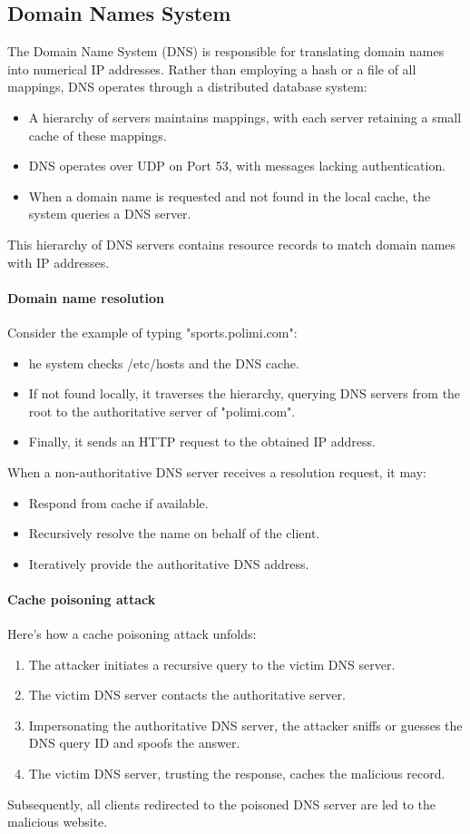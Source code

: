 \subsection{Domain Names System}
The Domain Name System (DNS) is responsible for translating domain names into numerical IP addresses. 
Rather than employing a hash or a file of all mappings, DNS operates through a distributed database system:
\begin{itemize}
    \item A hierarchy of servers maintains mappings, with each server retaining a small cache of these mappings.
    \item DNS operates over UDP on Port 53, with messages lacking authentication.
    \item When a domain name is requested and not found in the local cache, the system queries a DNS server.
\end{itemize}
This hierarchy of DNS servers contains resource records to match domain names with IP addresses.

\paragraph*{Domain name resolution}
Consider the example of typing "sports.polimi.com":
\begin{itemize}
    \item he system checks /etc/hosts and the DNS cache.
    \item If not found locally, it traverses the hierarchy, querying DNS servers from the root to the authoritative server of "polimi.com".
    \item Finally, it sends an HTTP request to the obtained IP address.
\end{itemize}
When a non-authoritative DNS server receives a resolution request, it may:
\begin{itemize}
    \item Respond from cache if available.
    \item Recursively resolve the name on behalf of the client.
    \item Iteratively provide the authoritative DNS address.
\end{itemize}

\paragraph*{Cache poisoning attack}
Here's how a cache poisoning attack unfolds:
\begin{enumerate}
    \item The attacker initiates a recursive query to the victim DNS server.
    \item The victim DNS server contacts the authoritative server.
    \item Impersonating the authoritative DNS server, the attacker sniffs or guesses the DNS query ID and spoofs the answer.
    \item The victim DNS server, trusting the response, caches the malicious record. 
\end{enumerate}
Subsequently, all clients redirected to the poisoned DNS server are led to the malicious website.

